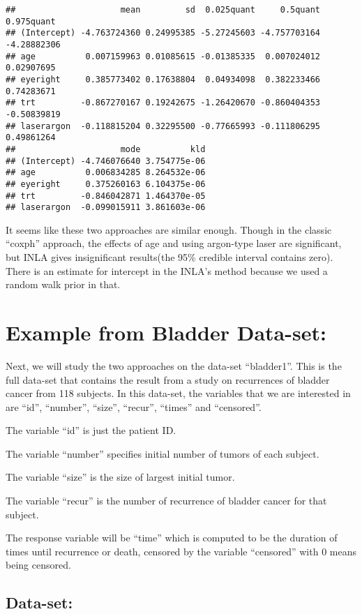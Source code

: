 \documentclass[]{article}
\begin{document}
\begin{verbatim}
##                     mean         sd  0.025quant     0.5quant  0.975quant
## (Intercept) -4.763724360 0.24995385 -5.27245603 -4.757703164 -4.28882306
## age          0.007159963 0.01085615 -0.01385335  0.007024012  0.02907695
## eyeright     0.385773402 0.17638804  0.04934098  0.382233466  0.74283671
## trt         -0.867270167 0.19242675 -1.26420670 -0.860404353 -0.50839819
## laserargon  -0.118815204 0.32295500 -0.77665993 -0.111806295  0.49861264
##                     mode          kld
## (Intercept) -4.746076640 3.754775e-06
## age          0.006834285 8.264532e-06
## eyeright     0.375260163 6.104375e-06
## trt         -0.846042871 1.464370e-05
## laserargon  -0.099015911 3.861603e-06
\end{verbatim}

It seems like these two approaches are similar enough. Though in the
classic ``coxph'' approach, the effects of age and using argon-type
laser are significant, but INLA gives insignificant results(the 95\%
credible interval contains zero). There is an estimate for intercept in
the INLA's method because we used a random walk prior in that.

\hypertarget{example-from-bladder-data-set}{%
\section{Example from Bladder
Data-set:}\label{example-from-bladder-data-set}}

Next, we will study the two approaches on the data-set ``bladder1''.
This is the full data-set that contains the result from a study on
recurrences of bladder cancer from 118 subjects. In this data-set, the
variables that we are interested in are ``id'', ``number'', ``size'',
``recur'', ``times'' and ``censored''.

The variable ``id'' is just the patient ID.

The variable ``number'' specifies initial number of tumors of each
subject.

The variable ``size'' is the size of largest initial tumor.

The variable ``recur'' is the number of recurrence of bladder cancer for
that subject.

The response variable will be ``time'' which is computed to be the
duration of times until recurrence or death, censored by the variable
``censored'' with 0 means being censored.

\hypertarget{data-set-1}{%
\subsection{Data-set:}\label{data-set-1}}
\end{document}
